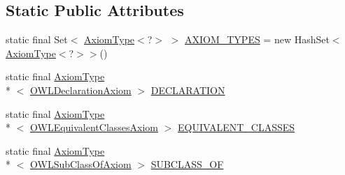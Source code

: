 \subsection*{Static Public Attributes}
\begin{DoxyCompactItemize}
\item 
static final Set$<$ \hyperlink{classorg_1_1semanticweb_1_1owlapi_1_1model_1_1_axiom_type_3_01_c_01extends_01_o_w_l_axiom_01_4_af3ef15094af1800e34dd66f6289c3631}{Axiom\-Type}$<$?$>$ $>$ \hyperlink{classorg_1_1semanticweb_1_1owlapi_1_1model_1_1_axiom_type_3_01_c_01extends_01_o_w_l_axiom_01_4_adaf77f6dd8d54a1c306a1378fffa8f6a}{A\-X\-I\-O\-M\-\_\-\-T\-Y\-P\-E\-S} = new Hash\-Set$<$\hyperlink{classorg_1_1semanticweb_1_1owlapi_1_1model_1_1_axiom_type_3_01_c_01extends_01_o_w_l_axiom_01_4_af3ef15094af1800e34dd66f6289c3631}{Axiom\-Type}$<$?$>$$>$()
\item 
static final \hyperlink{classorg_1_1semanticweb_1_1owlapi_1_1model_1_1_axiom_type_3_01_c_01extends_01_o_w_l_axiom_01_4_af3ef15094af1800e34dd66f6289c3631}{Axiom\-Type}\\*
$<$ \hyperlink{interfaceorg_1_1semanticweb_1_1owlapi_1_1model_1_1_o_w_l_declaration_axiom}{O\-W\-L\-Declaration\-Axiom} $>$ \hyperlink{classorg_1_1semanticweb_1_1owlapi_1_1model_1_1_axiom_type_3_01_c_01extends_01_o_w_l_axiom_01_4_aaf1ac40e27b3a7b1a919fbfefb3dbbd4}{D\-E\-C\-L\-A\-R\-A\-T\-I\-O\-N}
\item 
static final \hyperlink{classorg_1_1semanticweb_1_1owlapi_1_1model_1_1_axiom_type_3_01_c_01extends_01_o_w_l_axiom_01_4_af3ef15094af1800e34dd66f6289c3631}{Axiom\-Type}\\*
$<$ \hyperlink{interfaceorg_1_1semanticweb_1_1owlapi_1_1model_1_1_o_w_l_equivalent_classes_axiom}{O\-W\-L\-Equivalent\-Classes\-Axiom} $>$ \hyperlink{classorg_1_1semanticweb_1_1owlapi_1_1model_1_1_axiom_type_3_01_c_01extends_01_o_w_l_axiom_01_4_a0cca873dad6332da5bdd4ec0d6f9784d}{E\-Q\-U\-I\-V\-A\-L\-E\-N\-T\-\_\-\-C\-L\-A\-S\-S\-E\-S}
\item 
static final \hyperlink{classorg_1_1semanticweb_1_1owlapi_1_1model_1_1_axiom_type_3_01_c_01extends_01_o_w_l_axiom_01_4_af3ef15094af1800e34dd66f6289c3631}{Axiom\-Type}\\*
$<$ \hyperlink{interfaceorg_1_1semanticweb_1_1owlapi_1_1model_1_1_o_w_l_sub_class_of_axiom}{O\-W\-L\-Sub\-Class\-Of\-Axiom} $>$ \hyperlink{classorg_1_1semanticweb_1_1owlapi_1_1model_1_1_axiom_type_3_01_c_01extends_01_o_w_l_axiom_01_4_a8feb731c930d928937e830c67389fef0}{S\-U\-B\-C\-L\-A\-S\-S\-\_\-\-O\-F}
\item 
$$
\end{DoxyCompactItemize}
